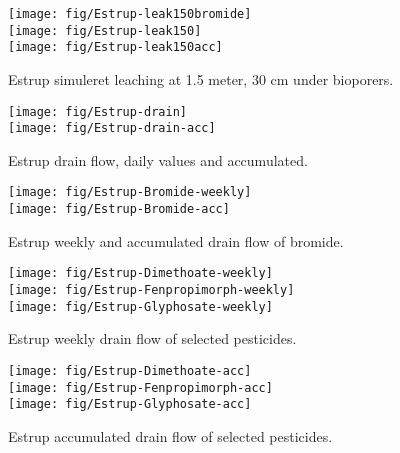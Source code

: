 \begin{figure}[htbp]
  \begin{center}
    \texttt{[image: fig/Estrup-leak150bromide]}\\
    \texttt{[image: fig/Estrup-leak150]}\\
    \texttt{[image: fig/Estrup-leak150acc]}
  \end{center}
  \caption{Estrup simuleret leaching at 1.5 meter, 30 cm under bioporers.}
  \label{fig:Estrup-leak150}
\end{figure}\FloatBarrier

\begin{figure}[htbp]
  \begin{center}
    \texttt{[image: fig/Estrup-drain]}\\
    \texttt{[image: fig/Estrup-drain-acc]}
  \end{center}
  \caption{Estrup drain flow, daily values and accumulated.}
  \label{fig:Estrup-drain}
\end{figure}\FloatBarrier

\begin{figure}[htbp]
  \begin{center}
    \texttt{[image: fig/Estrup-Bromide-weekly]}\\
    \texttt{[image: fig/Estrup-Bromide-acc]}
  \end{center}
  \caption{Estrup weekly and accumulated drain flow of bromide.}
  \label{fig:Estrup-bromide-weekly}
\end{figure}\FloatBarrier


\begin{figure}[htbp]
  \begin{center}
    \texttt{[image: fig/Estrup-Dimethoate-weekly]}\\
    \texttt{[image: fig/Estrup-Fenpropimorph-weekly]}\\
    \texttt{[image: fig/Estrup-Glyphosate-weekly]}\\
  \end{center}
  \caption{Estrup weekly drain flow of selected pesticides.}
  \label{fig:Estrup-weekly}
\end{figure}\FloatBarrier

\begin{figure}[htbp]
  \begin{center}
    \texttt{[image: fig/Estrup-Dimethoate-acc]}\\
    \texttt{[image: fig/Estrup-Fenpropimorph-acc]}\\
    \texttt{[image: fig/Estrup-Glyphosate-acc]}\\
  \end{center}
  \caption{Estrup accumulated drain flow of selected pesticides.}
  \label{fig:Estrup-acc}
\end{figure}\FloatBarrier

